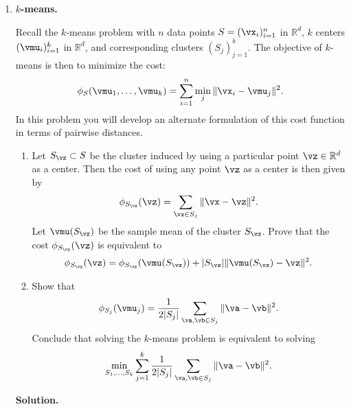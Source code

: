 \documentclass{article}
\theoremstyle{definition}
\theoremstyle{remark}
\newenvironment{Q}
                {%
                    \clearpage
                \item
                    }
                {%
                    \phantom{s}
                  \bigskip
                  \textbf{Solution.}
                }
\begin{document}
                \begin{enumerate}

                        \begin{Q}
                            \textbf{$k$-means.}
                            
        Recall the $k$-means problem with $n$ data points $S = (\vx_i)_{i=1}^n$ in $\mathbb{R}^d$, $k$ centers $(\vmu _i)_{i=1}^k$ in $\mathbb{R}^d$, and corresponding clusters $(S_j)_{j=1}^k$.  The objective of $k$-means is then to minimize the cost:
        						\begin{align*}
        						\phi_{S}( \vmu_1,\ldots,\vmu_k ) = \sum_{i=1}^n \min_{j} \Vert \vx_i - \vmu_j \Vert^2.
        						\end{align*}	
        					In this problem you will develop an alternate formulation of this cost function in terms of pairwise distances.
                            \begin{enumerate}
        						\item 					
        						Let $S_{\vz} \subset S$ be the cluster induced by using a particular point $\vz \in \mathbb{R}^d$ as a center. Then the cost of using any point $\vz$ as a center is then given by
        						\begin{align*}
        						\phi_{S_{\vz}} (\vz) = \sum_{\vx \in S_{z}} \Vert \vx - \vz \Vert^2.
        						\end{align*}
        						Let $\vmu(S_{\vz})$ be the sample mean of the cluster $S_{\vz}$.  Prove that the cost $\phi_{S_{\vz}}(\vz)$ is equivalent to				
        						\begin{align*}
        						\phi_{S_{\vz}}( \vz ) = \phi_{S_{\vz}}(\vmu(S_{\vz})) + |S_{\vz}| \Vert \vmu(S_{\vz}) - \vz \Vert ^2.
        						\end{align*}
        					\item Show that
        					\begin{align*}
        					\phi_{S_j}(\vmu_j) = \frac{1}{2|S_j|} \sum_{\va,\vb \in S_j} \Vert \va - \vb \Vert^2 .
        					\end{align*}
        					Conclude that solving the $k$-means problem is equivalent to solving
        					\begin{align*}
        					\min_{S_1,\dots,S_k} \sum_{j=1}^k \frac{1}{2|S_j|} \sum_{\va,\vb \in S_j } \Vert \va - \vb \Vert^2.
        					\end{align*}

                            \end{enumerate}                    
                        \end{Q}
                    

\end{enumerate}
\end{document}
